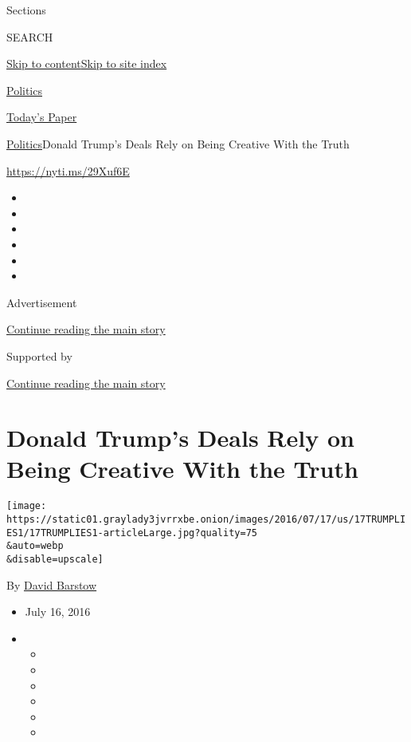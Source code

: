 Sections

SEARCH

\protect\hyperlink{site-content}{Skip to
content}\protect\hyperlink{site-index}{Skip to site index}

\href{https://www.nytimes3xbfgragh.onion/section/politics}{Politics}

\href{https://myaccount.nytimes3xbfgragh.onion/auth/login?response_type=cookie\&client_id=vi}{}

\href{https://www.nytimes3xbfgragh.onion/section/todayspaper}{Today's
Paper}

\href{/section/politics}{Politics}\textbar{}Donald Trump's Deals Rely on
Being Creative With the Truth

\url{https://nyti.ms/29Xuf6E}

\begin{itemize}
\item
\item
\item
\item
\item
\item
\end{itemize}

Advertisement

\protect\hyperlink{after-top}{Continue reading the main story}

Supported by

\protect\hyperlink{after-sponsor}{Continue reading the main story}

\hypertarget{donald-trumps-deals-rely-on-being-creative-with-the-truth}{%
\section{Donald Trump's Deals Rely on Being Creative With the
Truth}\label{donald-trumps-deals-rely-on-being-creative-with-the-truth}}

\texttt{[image: https://static01.graylady3jvrrxbe.onion/images/2016/07/17/us/17TRUMPLIES1/17TRUMPLIES1-articleLarge.jpg?quality=75\\\&auto=webp\\\&disable=upscale]}

By \href{https://www.nytimes3xbfgragh.onion/by/david-barstow}{David
Barstow}

\begin{itemize}
\item
  July 16, 2016
\item
  \begin{itemize}
  \item
  \item
  \item
  \item
  \item
  \item
  \end{itemize}
\end{itemize}

